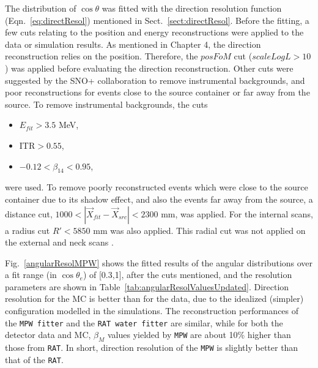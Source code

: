 The distribution of $\cos\theta$ was fitted with the direction resolution function (Eqn.~\ref{eq:directResol}) mentioned in Sect.~\ref{sect:directResol}. Before the fitting, a few cuts relating to the position and energy reconstructions were applied to the data or simulation results. As mentioned in Chapter 4, the direction reconstruction relies on the position. Therefore, the $posFoM$ cut ($scaleLogL>10$) was applied before evaluating the direction reconstruction. Other cuts were suggested by the SNO+ collaboration to remove instrumental backgrounds, and poor reconstructions for events close to the source container or far away from the source. To remove instrumental backgrounds, the cuts
\begin{itemize}
\item $E_{fit} > 3.5$ MeV\;,
\item ITR$>0.55$\;,
\item $-0.12<\beta_{14}<0.95$\;,
\end{itemize}
were used. To remove poorly reconstructed events which were close to the source container due to its shadow effect, and also the events far away from the source, a distance cut, $1000<|\vec{X}_{fit}-\vec{X}_{src}|<2300$ mm, was applied. For the internal scans, a radius cut $R'<5850$ mm was also applied. This radial cut was not applied on the external and neck scans \cite{waterunidoc}.

Fig.~\ref{angularResolMPW} shows the fitted results of the angular distributions over a fit range (in $\cos \theta_e$) of [0.3,1], after the cuts mentioned, and the resolution parameters are shown in Table~\ref{tab:angularResolValuesUpdated}. Direction resolution for the MC is better than for the data, due to the idealized (simpler) configuration modelled in the simulations. The reconstruction performances of the \texttt{MPW fitter} and the \texttt{RAT water fitter} are similar, while for both the detector data and MC, $\beta_M$ values yielded by \texttt{MPW} are about 10\% higher than those from \texttt{RAT}. In short, direction resolution of the \texttt{MPW} is slightly better than that of the \texttt{RAT}.

